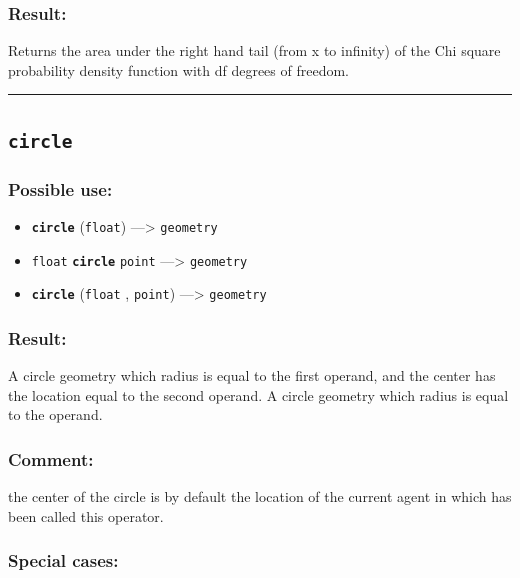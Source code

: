 \documentclass[]{book}
\providecommand{\tightlist}{%
  \setlength{\itemsep}{0pt}\setlength{\parskip}{0pt}}
\theoremstyle{definition}
\theoremstyle{definition}
\theoremstyle{definition}
\theoremstyle{remark}
\begin{document}
\subsubsection{Result:}\label{result-82}

Returns the area under the right hand tail (from x to infinity) of the
Chi square probability density function with df degrees of freedom.

\begin{center}\rule{0.5\linewidth}{\linethickness}\end{center}

\subsection{\texorpdfstring{\texttt{circle}}{circle}}\label{circle}

\subsubsection{Possible use:}\label{possible-use-85}

\begin{itemize}
\tightlist
\item
  \textbf{\texttt{circle}} (\texttt{float}) ---\textgreater{}
  \texttt{geometry}
\item
  \texttt{float} \textbf{\texttt{circle}} \texttt{point}
  ---\textgreater{} \texttt{geometry}
\item
  \textbf{\texttt{circle}} (\texttt{float} , \texttt{point})
  ---\textgreater{} \texttt{geometry}
\end{itemize}

\subsubsection{Result:}\label{result-83}

A circle geometry which radius is equal to the first operand, and the
center has the location equal to the second operand. A circle geometry
which radius is equal to the operand.

\subsubsection{Comment:}\label{comment-17}

the center of the circle is by default the location of the current agent
in which has been called this operator.

\subsubsection{Special cases:}\label{special-cases-28}
\end{document}
